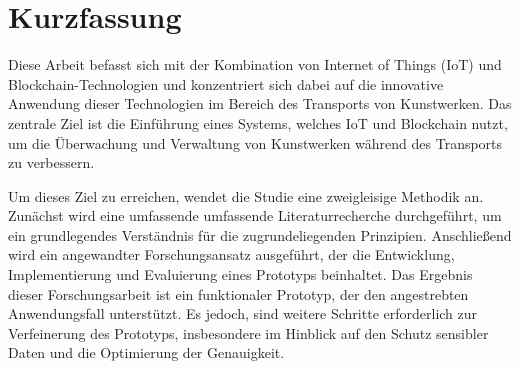 

\chapter*{Kurzfassung}
Diese Arbeit befasst sich mit der Kombination von Internet of Things (IoT) und Blockchain-Technologien und konzentriert sich dabei auf die innovative Anwendung dieser Technologien im Bereich des Transports von Kunstwerken. Das zentrale Ziel ist die Einführung eines Systems, welches IoT und Blockchain nutzt, um die Überwachung und Verwaltung von Kunstwerken während des Transports zu verbessern.

Um dieses Ziel zu erreichen, wendet die Studie eine zweigleisige Methodik an. Zunächst wird eine umfassende umfassende Literaturrecherche durchgeführt, um ein grundlegendes Verständnis für die zugrundeliegenden Prinzipien. Anschließend wird ein angewandter Forschungsansatz ausgeführt, der die Entwicklung, Implementierung und Evaluierung eines Prototyps beinhaltet. Das Ergebnis dieser Forschungsarbeit ist ein funktionaler Prototyp, der
den angestrebten Anwendungsfall unterstützt. Es jedoch, sind weitere Schritte erforderlich zur Verfeinerung des Prototyps, insbesondere im Hinblick auf den Schutz sensibler Daten und die Optimierung der Genauigkeit.

